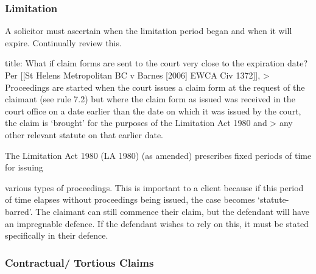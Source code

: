 \documentclass[
]{article}
\newenvironment{Shaded}{}{}
\newcommand{\NormalTok}[1]{#1}
\begin{document}
\hypertarget{limitation}{%
\subsubsection{Limitation}\label{limitation}}

A solicitor must ascertain when the limitation period began and when it
will expire. Continually review this.

\begin{Shaded}
\begin{Highlighting}[]
\NormalTok{title: What if claim forms are sent to the court very close to the expiration date?}
\NormalTok{Per [[St Helens Metropolitan BC v Barnes [2006] EWCA Civ 1372]], }
\NormalTok{\textgreater{} Proceedings are started when the court issues a claim form at the request of the claimant (see rule 7.2) but where the claim form as issued was received in the court office on a date earlier than the date on which it was issued by the court, the claim is ‘brought’ for the purposes of the Limitation Act 1980 and}
\NormalTok{\textgreater{} any other relevant statute on that earlier date.}
\end{Highlighting}
\end{Shaded}

The Limitation Act 1980 (LA 1980) (as amended) prescribes fixed periods
of time for issuing

various types of proceedings. This is important to a client because if
this period of time elapses without proceedings being issued, the case
becomes `statute-barred'. The claimant can still commence their claim,
but the defendant will have an impregnable defence. If the defendant
wishes to rely on this, it must be stated specifically in their defence.

\hypertarget{contractual-tortious-claims}{%
\subsubsection{Contractual/ Tortious
Claims}\label{contractual-tortious-claims}}
\end{document}
